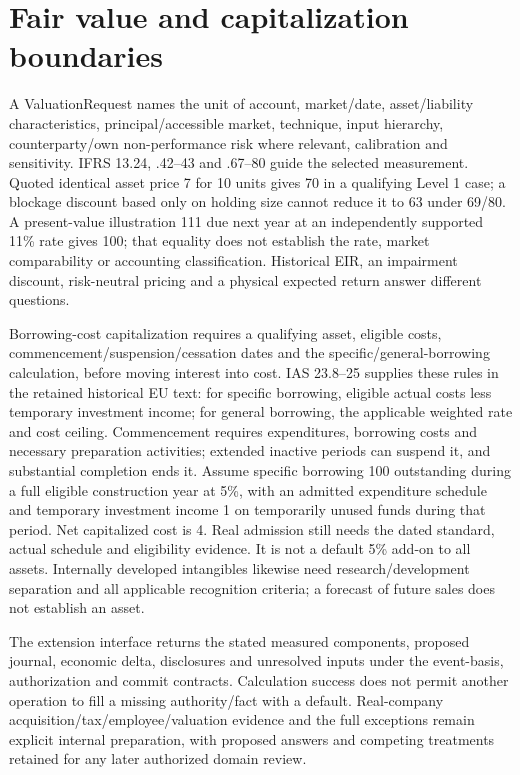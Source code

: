 \hypertarget{fair-value-and-capitalization-boundaries}{%
\section{Fair value and capitalization boundaries}\label{method-corporate-extensions-fair-value-and-capitalization-boundaries}}

A ValuationRequest names the unit of account, market/date, asset/liability characteristics, principal/accessible market, technique, input hierarchy, counterparty/own non-performance risk where relevant, calibration and sensitivity. IFRS 13.24, .42--43 and .67--80 guide the selected measurement. Quoted identical asset price 7 for 10 units gives 70 in a qualifying Level 1 case; a blockage discount based only on holding size cannot reduce it to 63 under 69/80. A present-value illustration 111 due next year at an independently supported 11\% rate gives 100; that equality does not establish the rate, market comparability or accounting classification. Historical EIR, an impairment discount, risk-neutral pricing and a physical expected return answer different questions.

Borrowing-cost capitalization requires a qualifying asset, eligible costs, commencement/suspension/cessation dates and the specific/general-borrowing calculation, before moving interest into cost. IAS 23.8--25 supplies these rules in the retained historical EU text: for specific borrowing, eligible actual costs less temporary investment income; for general borrowing, the applicable weighted rate and cost ceiling. Commencement requires expenditures, borrowing costs and necessary preparation activities; extended inactive periods can suspend it, and substantial completion ends it. Assume specific borrowing 100 outstanding during a full eligible construction year at 5\%, with an admitted expenditure schedule and temporary investment income 1 on temporarily unused funds during that period. Net capitalized cost is 4. Real admission still needs the dated standard, actual schedule and eligibility evidence. It is not a default 5\% add-on to all assets. Internally developed intangibles likewise need research/development separation and all applicable recognition criteria; a forecast of future sales does not establish an asset.

The extension interface returns the stated measured components, proposed journal, economic delta, disclosures and unresolved inputs under the event-basis, authorization and commit contracts. Calculation success does not permit another operation to fill a missing authority/fact with a default. Real-company acquisition/tax/employee/valuation evidence and the full exceptions remain explicit internal preparation, with proposed answers and competing treatments retained for any later authorized domain review.
